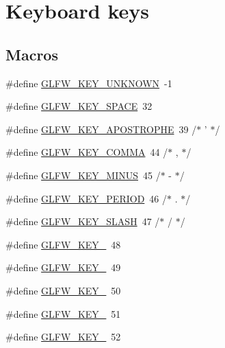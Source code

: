 \hypertarget{group__keys}{\section{Keyboard keys}
\label{group__keys}
}
\subsection*{Macros}
\begin{DoxyCompactItemize}
\item 
\#define \hyperlink{group__keys_ga99aacc875b6b27a072552631e13775c7}{G\-L\-F\-W\-\_\-\-K\-E\-Y\-\_\-\-U\-N\-K\-N\-O\-W\-N}~-\/1
\item 
\#define \hyperlink{group__keys_gaddb2c23772b97fd7e26e8ee66f1ad014}{G\-L\-F\-W\-\_\-\-K\-E\-Y\-\_\-\-S\-P\-A\-C\-E}~32
\item 
\#define \hyperlink{group__keys_ga6059b0b048ba6980b6107fffbd3b4b24}{G\-L\-F\-W\-\_\-\-K\-E\-Y\-\_\-\-A\-P\-O\-S\-T\-R\-O\-P\-H\-E}~39  /$\ast$ ' $\ast$/
\item 
\#define \hyperlink{group__keys_gab3d5d72e59d3055f494627b0a524926c}{G\-L\-F\-W\-\_\-\-K\-E\-Y\-\_\-\-C\-O\-M\-M\-A}~44  /$\ast$ , $\ast$/
\item 
\#define \hyperlink{group__keys_gac556b360f7f6fca4b70ba0aecf313fd4}{G\-L\-F\-W\-\_\-\-K\-E\-Y\-\_\-\-M\-I\-N\-U\-S}~45  /$\ast$ -\/ $\ast$/
\item 
\#define \hyperlink{group__keys_ga37e296b650eab419fc474ff69033d927}{G\-L\-F\-W\-\_\-\-K\-E\-Y\-\_\-\-P\-E\-R\-I\-O\-D}~46  /$\ast$ . $\ast$/
\item 
\#define \hyperlink{group__keys_gadf3d753b2d479148d711de34b83fd0db}{G\-L\-F\-W\-\_\-\-K\-E\-Y\-\_\-\-S\-L\-A\-S\-H}~47  /$\ast$ / $\ast$/
\item 
\#define \hyperlink{group__keys_ga50391730e9d7112ad4fd42d0bd1597c1}{G\-L\-F\-W\-\_\-\-K\-E\-Y\-\_}~48
\item 
\#define \hyperlink{group__keys_ga05e4cae9ddb8d40cf6d82c8f11f2502f}{G\-L\-F\-W\-\_\-\-K\-E\-Y\-\_}~49
\item 
\#define \hyperlink{group__keys_gadc8e66b3a4c4b5c39ad1305cf852863c}{G\-L\-F\-W\-\_\-\-K\-E\-Y\-\_}~50
\item 
\#define \hyperlink{group__keys_ga812f0273fe1a981e1fa002ae73e92271}{G\-L\-F\-W\-\_\-\-K\-E\-Y\-\_}~51
\item 
\#define \hyperlink{group__keys_ga9e14b6975a9cc8f66cdd5cb3d3861356}{G\-L\-F\-W\-\_\-\-K\-E\-Y\-\_}~52
\item 

\end{DoxyCompactItemize}
